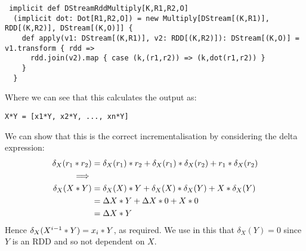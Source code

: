 \vs\begin{lstlisting}
 implicit def DStreamRddMultiply[K,R1,R2,O]
  (implicit dot: Dot[R1,R2,O]) = new Multiply[DStream[(K,R1)], RDD[(K,R2)], DStream[(K,O)]] {
    def apply(v1: DStream[(K,R1)], v2: RDD[(K,R2)]): DStream[(K,O)] = v1.transform { rdd =>
      rdd.join(v2).map { case (k,(r1,r2)) => (k,dot(r1,r2)) }
    }
  }
\end{lstlisting}\vs
Where we can see that this calculates the output as:
\vs\begin{lstlisting}
X*Y = [x1*Y, x2*Y, ..., xn*Y]
\end{lstlisting}\vs
We can show that this is the correct incrementalisation by considering the delta expression:
\begin{equation*}
\begin{split}
\delta_X(r_1 * r_2) &= \delta_X(r_1)*r_2 + \delta_X(r_1)*\delta_X(r_2) + r_1*\delta_X(r_2) \\
\implies \\
\delta_X(X*Y)& = \delta_X(X)*Y + \delta_X(X)*\delta_X(Y) + X*\delta_X(Y) \\
	  &= \Delta X*Y + \Delta X*0 + X*0 \\
	  &= \Delta X*Y
\end{split}
\end{equation*}
Hence $\delta_X(X^{i-1}*Y) = x_i*Y$, as required. We use in this that $\delta_X(Y) = 0$ since $Y$ is an RDD and so not dependent on $X$.

